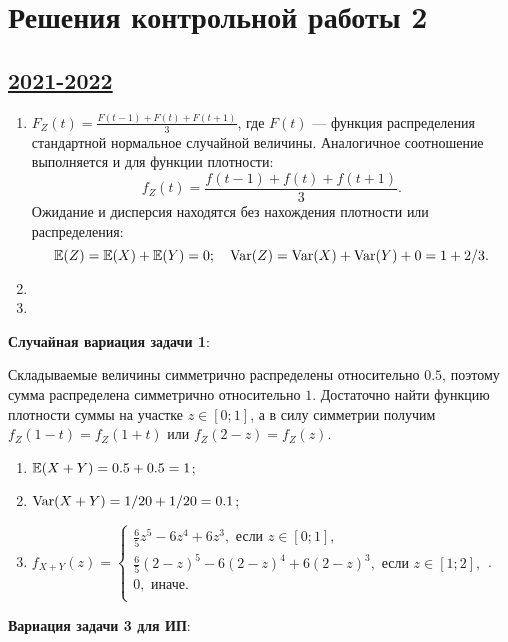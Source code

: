 \thispagestyle{empty}
\section{Решения контрольной работы 2}


\subsection[2021-2022]{\hyperref[sec:sol_kr_02_2021_2022]{2021-2022}}
\label{sec:sol_kr_02_2021_2022}




\begin{enumerate}
	\item $F_Z(t) = \frac{F(t-1) + F(t) + F(t+1)}{3}$, где $F(t)$ — функция распределения стандартной нормальное случайной величины.
	Аналогичное соотношение выполняется и для функции плотности:
	\[
	f_Z(t) = \frac{f(t-1) + f(t) + f(t+1)}{3}.
	\]
	Ожидание и дисперсия находятся без нахождения плотности или распределения:
	\[
	\operatorname{\mathbb{E}}(Z) = \operatorname{\mathbb{E}}(X) + \operatorname{\mathbb{E}}(Y) = 0; \quad \operatorname{Var}(Z) = \operatorname{Var}(X) + \operatorname{Var}(Y) + 0 = 1 + 2/3.  
	\]
	\item 
	\item 
  \end{enumerate}
  

  \textbf{Случайная вариация задачи 1}:

  Складываемые величины симметрично распределены относительно $0.5$, поэтому сумма распределена симметрично относительно $1$. 
  Достаточно найти функцию плотности суммы на участке $z\in [0;1]$, а в силу симметрии получим $f_Z(1- t) = f_Z(1 + t)$ 
  или $f_Z(2-z) = f_Z(z)$.

  \begin{enumerate}
    \item $\operatorname{\mathbb{E}}(X+Y) = 0.5 + 0.5 = 1$;
    \item $\operatorname{Var}(X+Y) = 1/20 + 1/20 = 0.1$;
    \item $f_{X+Y}(z) = \begin{cases}
	\frac{6}{5}z^5 - 6z^4 + 6z^3, \text{ если } z \in [0;1], \\
	\frac{6}{5}(2-z)^5 - 6(2-z)^4 + 6(2-z)^3, \text{ если } z \in [1;2], \\
	0, \text{ иначе.} \\
	\end{cases}$.
\end{enumerate}


\textbf{Вариация задачи 3 для ИП}:





